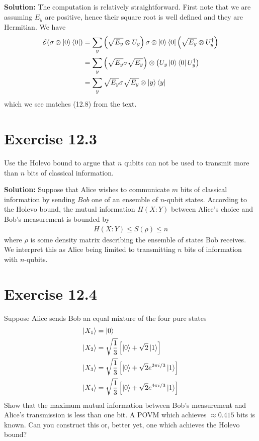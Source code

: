 \documentclass{book}
\newcommand{\mc}[1]{\mathcal{#1}}
\begin{document}
    \textbf{Solution:} The computation is relatively straightforward. First note that we are assuming $E_y$ are positive, hence their square root is well defined and they are Hermitian. We have
    \begin{align}
    \begin{aligned}
        \mc{E}(\sigma \otimes \ket{0} \bra{0}) &=\sum_y \left(\sqrt{E_y} \otimes U_y\right) \sigma \otimes \ket{0}\bra{0} \left(\sqrt{E_y} \otimes U_y^\dagger\right) \\
        &= \sum_y \left(\sqrt{E_y} \sigma \sqrt{E_y}\right) \otimes \left(U_y \ket{0}\bra{0} U_y^\dagger\right) \\
        &= \sum_y \sqrt{E_y} \sigma \sqrt{E_y} \otimes \ket{y}\bra{y}
    \end{aligned}
    \end{align}
    which we see matches (12.8) from the text.
    
\section*{Exercise 12.3}
    Use the Holevo bound to argue that $n$ qubits can not be used to transmit more than $n$ bits of classical information.
    
    \textbf{Solution:} Suppose that Alice wishes to communicate $m$ bits of classical information by sending $Bob$ one of an ensemble of $n$-qubit states. According to the Holevo bound, the mutual information $H(X:Y)$ between Alice's choice and Bob's measurement is bounded by
    \begin{align}
        H(X:Y) \leq S(\rho) \leq n
    \end{align}
    where $\rho$ is some density matrix describing the ensemble of states Bob receives. We interpret this as Alice being limited to transmitting $n$ bits of information with $n$-qubits.
    
\section*{Exercise 12.4}
    Suppose Alice sends Bob an equal mixture of the four pure states
    \begin{align}
        \ket{X_1} &= \ket{0} \\
        \ket{X_2} &= \sqrt{\frac{1}{3}}\left[\ket{0} + \sqrt{2}\ket{1}\right] \\
        \ket{X_3} &= \sqrt{\frac{1}{3}}\left[\ket{0} + \sqrt{2} e^{2\pi i /3}\ket{1}\right] \\
        \ket{X_4} &= \sqrt{\frac{1}{3}}\left[\ket{0} + \sqrt{2} e^{4\pi i /3}\ket{1}\right]
    \end{align}
    Show that the maximum mutual information between Bob’s measurement and Alice’s transmission is less than one bit. A POVM which achieves $\approx 0.415$ bits is known. Can you construct this or, better yet, one which achieves the Holevo bound?
\end{document}
